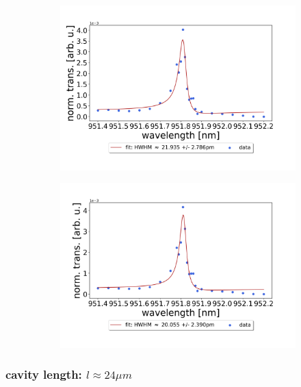 \begin{figure}[h!]
\begin{subfigure}[b]{0.49\textwidth}
        \includegraphics[width=\textwidth]{figures/results/single fano fits/60um_M5_fit_3.png}
        \caption{}
        \label{fig:60um_M5_fit_3}
    \end{subfigure}
    \begin{subfigure}[b]{0.49\textwidth}
        \includegraphics[width=\textwidth]{figures/results/single fano fits/60um_M5_fit_4.png}
        \caption{}
        \label{fig:60um_M5_fit_4}
    \end{subfigure}
\end{figure}

\clearpage
\subsubsection*{cavity length: $l \approx 24 \mu m$}

